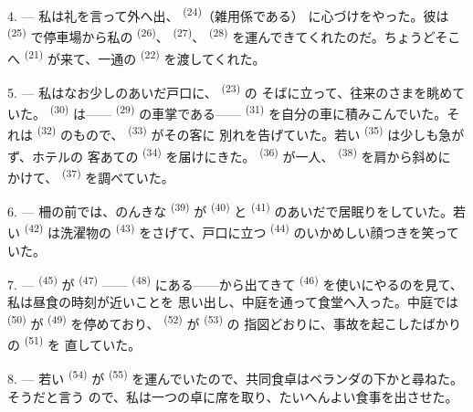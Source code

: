 4. --- 私は礼を言って外へ出、 \textsuperscript{(24)}（雑用係である）
に心づけをやった。彼は \textsuperscript{(25)} で停車場から私の
 \textsuperscript{(26)}、 \textsuperscript{(27)}、
 \textsuperscript{(28)} を運んできてくれたのだ。ちょうどそこへ
 \textsuperscript{(21)} が来て、一通の
\textsuperscript{(22)} を渡してくれた。

5. --- 私はなお少しのあいだ戸口に、 \textsuperscript{(23)} の
そばに立って、往来のさまを眺めていた。 \textsuperscript{(30)} は——
 \textsuperscript{(29)} の車掌である——
\textsuperscript{(31)} を自分の車に積みこんでいた。それは
\textsuperscript{(32)} のもので、 \textsuperscript{(33)} がその客に
別れを告げていた。若い \textsuperscript{(35)} は少しも急がず、ホテルの
客あての \textsuperscript{(34)} を届けにきた。
\textsuperscript{(36)} が一人、 \textsuperscript{(38)} を肩から斜めに
かけて、 \textsuperscript{(37)} を調べていた。

\VUsaut{4.0mm}
\VUsaut{3.0mm}

6. --- 柵の前では、のんきな \textsuperscript{(39)} が
 \textsuperscript{(40)} と \textsuperscript{(41)}
のあいだで居眠りをしていた。若い \textsuperscript{(42)} は洗濯物の
 \textsuperscript{(43)} をさげて、戸口に立つ
\textsuperscript{(44)} のいかめしい顔つきを笑っていた。

7. ---  \textsuperscript{(45)} が
\textsuperscript{(47)} —— \textsuperscript{(48)} にある——から出てきて
 \textsuperscript{(46)} を使いにやるのを見て、私は昼食の時刻が近いことを
思い出し、中庭を通って食堂へ入った。中庭では
\textsuperscript{(50)} が \textsuperscript{(49)} を停めており、
 \textsuperscript{(52)} が \textsuperscript{(53)} の
指図どおりに、事故を起こしたばかりの \textsuperscript{(51)} を
直していた。

8. --- 若い \textsuperscript{(54)} が
\textsuperscript{(55)} を運んでいたので、共同食卓はベランダの下かと尋ねた。そうだと言う
ので、私は一つの卓に席を取り、たいへんよい食事を出させた。

